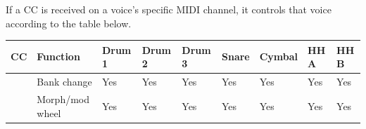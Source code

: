 If a CC is received on a voice's specific MIDI channel, it controls that
voice according to the table below.

{\def\LTcaptype{none} %
\begin{longtable}[]{@{}
  >{\raggedleft\arraybackslash}p{}
  >{\raggedright\arraybackslash}p{}
  >{\raggedright\arraybackslash}p{}
  >{\raggedright\arraybackslash}p{}
  >{\raggedright\arraybackslash}p{}
  >{\raggedright\arraybackslash}p{}
  >{\raggedright\arraybackslash}p{}
  >{\raggedright\arraybackslash}p{}
  >{\raggedright\arraybackslash}p{}@{}}
\toprule\noalign{}
\begin{minipage}[b]{\linewidth}\raggedleft
CC
\end{minipage} & \begin{minipage}[b]{\linewidth}\raggedright
Function
\end{minipage} & \begin{minipage}[b]{\linewidth}\raggedright
Drum 1
\end{minipage} & \begin{minipage}[b]{\linewidth}\raggedright
Drum 2
\end{minipage} & \begin{minipage}[b]{\linewidth}\raggedright
Drum 3
\end{minipage} & \begin{minipage}[b]{\linewidth}\raggedright
Snare
\end{minipage} & \begin{minipage}[b]{\linewidth}\raggedright
Cymbal
\end{minipage} & \begin{minipage}[b]{\linewidth}\raggedright
HH A
\end{minipage} & \begin{minipage}[b]{\linewidth}\raggedright
HH B
\end{minipage} \\
\midrule\noalign{}
\endhead
\bottomrule\noalign{}
\endlastfoot
0 & Bank change & Yes & Yes & Yes & Yes & Yes & Yes & Yes \\
1 & Morph/mod wheel & Yes & Yes & Yes & Yes & Yes & Yes & Yes \\

\end{longtable}}
